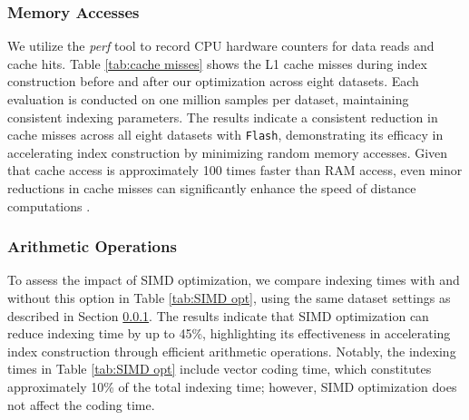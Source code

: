 \subsubsection{\textbf{Memory Accesses}}
\label{subsubsec: memory access}
We utilize the \textit{perf} tool to record CPU hardware counters for data reads and cache hits. Table \ref{tab:cache misses} shows the L1 cache misses during index construction before and after our optimization across eight datasets. Each evaluation is conducted on one million samples per dataset, maintaining consistent indexing parameters. The results indicate a consistent reduction in cache misses across all eight datasets with \texttt{Flash}, demonstrating its efficacy in accelerating index construction by minimizing random memory accesses. Given that cache access is approximately 100 times faster than RAM access, even minor reductions in cache misses can significantly enhance the speed of distance computations \cite{ColemanSSS22}.

\subsubsection{\textbf{Arithmetic Operations}}

\begin{table}[t]
\vspace{-0.1cm}
 \fontsize{7.5pt}{4mm}\selectfont
  \caption{Indexing time without and with SIMD optimization.}
  \vspace{-0.4cm}
  \label{tab:SIMD opt}
  \vspace{-0.2cm}
\end{table}

To assess the impact of SIMD optimization, we compare indexing times with and without this option in Table \ref{tab:SIMD opt}, using the same dataset settings as described in Section \ref{subsubsec: memory access}. The results indicate that SIMD optimization can reduce indexing time by up to 45\%, highlighting its effectiveness in accelerating index construction through efficient arithmetic operations. Notably, the indexing times in Table \ref{tab:SIMD opt} include vector coding time, which constitutes approximately 10\% of the total indexing time; however, SIMD optimization does not affect the coding time.

